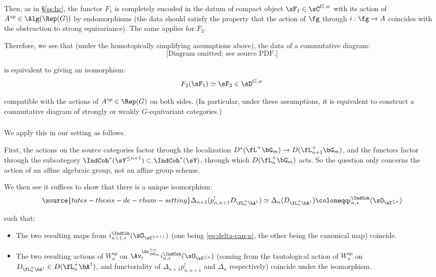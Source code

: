 Then, as in \S \ref{ss:hc}, the
functor $F_1$ is completely encoded in the datum of compact
object $\sF_1 \in \sC^{G,w}$ with its action of $A^{op} \in \Alg(\Rep(G))$ by
endomorphisms (the data should satisfy the property that the action of
$\fg$ through $i:\fg \to A$ coincides with the obstruction to strong equivariance).
The same applies for $F_3$.

Therefore, we see that (under the homotopically simplifying assumptions
above), the data of a commutative diagram:
%
\[
\text{[Diagram omitted; see source PDF.]}
\]

 is equivalent to giving an isomorphism:
%
\[
F_2(\sF_1) \simeq \sF_3 \in \sD^{G,w}
\]

 compatible with the actions of $A^{op} \in \Rep(G)$ on both sides.
(In particular, under these assumptions, it is equivalent to construct
a commutative diagram of strongly or weakly $G$-equivariant categories.)

\subsubsection{}

We apply this in our setting as follows.

First, the actions on the source categories factor through the localization
$D^*(\fL^+\bG_m) \to D(\fL_{n+1}^+\bG_m)$, and the functors
factor through the subcategory $\IndCoh^*(\sY^{\leq n+1}) \subset \IndCoh^*(\sY)$,
through which $D(\fL_n^+\bG_m)$ acts. So the question only concerns the
action of an affine algebraic group, not an affine group scheme.

We then see
it suffices to show that there is a unique isomorphism:
%
\begin{equation}\label{eq:comm-iso}
\source{tates-thesis-de-rham-setting}
\Delta_{n+1}(p_{n,n+1}^! D_{\fL_n^+ \bA^1})
\simeq
\Delta_n(D_{\fL_n^+ \bA^1})
\coloneqq
i_{n,*}^{\IndCoh}(\sO_{\sZ^{\leq n}})
\end{equation}

 such that:

\begin{itemize}

\item The two resulting maps from $i_{n+1,*}^{\IndCoh}(\sO_{\sZ^{\leq n+1}})$
(one being \eqref{eq:delta-can-n}, the other being the canonical map)
coincide.

\item The two resulting actions of $W_n^{op}$ on
$\Av_!^{\Gr_{\bG_m}^{\leq n}}i_{n,*}^{\IndCoh}(\sO_{\sZ^{\leq n}})$ (coming from
the tautological action of
$W_n^{op}$ on $D_{\fL_n^+\bA^1} \in D(\fL_n^+\bA^1)$, and functoriality of
$\Delta_{n+1}p_{n,n+1}^!$ and $\Delta_n$ respectively) coincide
under the isomorphism.

\end{itemize}

